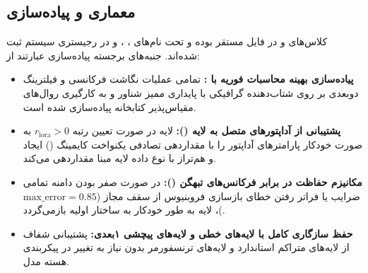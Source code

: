 \subsection{معماری و پیاده‌سازی}
کلاس‌های  و  در فایل  مستقر بوده و تحت نام‌های ، ،  و  در رجیستری سیستم ثبت شده‌اند. جنبه‌های برجسته پیاده‌سازی عبارتند از:
\begin{itemize}
    \item \textbf{پیاده‌سازی بهینه محاسبات فوریه با :} تمامی عملیات نگاشت فرکانسی و فیلترینگ دو‌بعدی بر روی شتاب‌دهنده گرافیکی با پایداری ممیز شناور  و به کارگیری روال‌های مقیاس‌پذیر کتابخانه  پیاده‌سازی شده است.
    \item \textbf{پشتیبانی از آداپتورهای  متصل به لایه ():} لایه  در صورت تعیین رتبه $r_{\text{lora}} > 0$ به صورت خودکار پارامترهای آداپتور را با مقداردهی تصادفی یکنواخت کایمینگ () ایجاد و هم‌تراز با نوع داده لایه مبنا مقداردهی می‌کند.
    \item \textbf{مکانیزم حفاظت در برابر فرکانس‌های تبهگن ():} در صورت صفر بودن دامنه تمامی ضرایب یا فراتر رفتن خطای بازسازی فروبنیوس از سقف مجاز ($\text{max\_error}=0.85$)، لایه به طور خودکار به ساختار اولیه بازمی‌گردد.
    \item \textbf{حفظ سازگاری کامل با لایه‌های خطی و لایه‌های پیچشی ۱بعدی:} پشتیبانی شفاف از لایه‌های متراکم استاندارد و لایه‌های  ترنسفورمر بدون نیاز به تغییر در پیکربندی هسته مدل.
\end{itemize}

